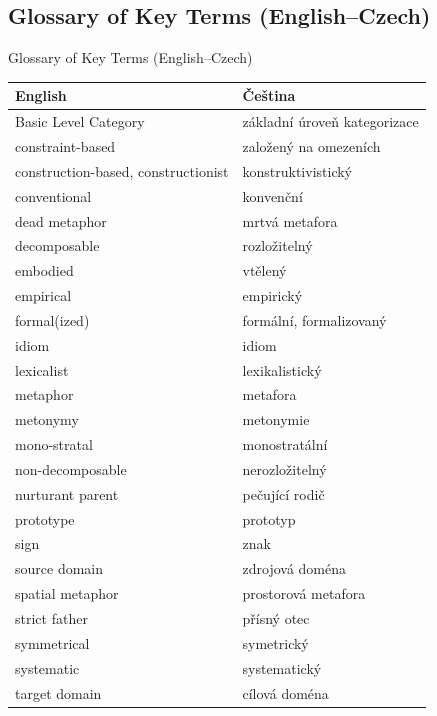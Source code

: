 \subsection*{Glossary of Key Terms (English--Czech)}

\begin{frame}[allowframebreaks]{Glossary of Key Terms (English--Czech)}

\begin{flushleft}
\begin{longtable}{ll}
  English & Čeština \\\hline \endhead
  Basic Level Category & základní úroveň kategorizace \\
constraint-based & založený na omezeních \\
construction-based, constructionist & konstruktivistický \\
conventional & konvenční \\
dead metaphor & mrtvá metafora \\
decomposable & rozložitelný \\
embodied & vtělený \\
empirical & empirický \\
formal(ized) & formální, formalizovaný \\
idiom & idiom \\
lexicalist & lexikalistický \\
metaphor & metafora \\
metonymy & metonymie \\
mono-stratal & monostratální \\
non-decomposable & nerozložitelný \\
nurturant parent & pečující rodič \\
prototype & prototyp \\
sign & znak \\
source domain & zdrojová doména \\
spatial metaphor & prostorová metafora \\
strict father & přísný otec \\
symmetrical & symetrický \\
systematic & systematický \\
target domain & cílová doména \\
\end{longtable}
\end{flushleft}

\end{frame}
